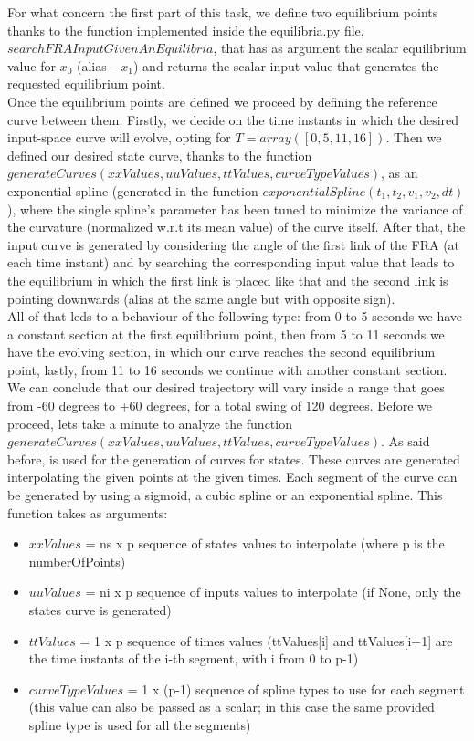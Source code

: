 \documentclass[a4paper,11pt,oneside]{book}
\begin{document}
\begin{justify}
    {For what concern the first part of this task, we define two equilibrium points thanks to the function implemented inside the equilibria.py file, $searchFRAInputGivenAnEquilibria$, that has as argument the scalar equilibrium value for $x_{0}$ (alias $-x_{1}$) and returns the scalar input value that generates the requested equilibrium point.
    \\Once the equilibrium points are defined we proceed by defining the reference curve between them. Firstly, we decide on the time instants in which the desired input-space curve will evolve, opting for $T = array([0, 5, 11, 16])$. Then we defined our desired state curve, thanks to the function $generateCurves(xxValues, uuValues, ttValues, curveTypeValues)$, as an exponential spline (generated in the function $exponentialSpline(t_1, t_2, v_1, v_2, dt)$), where the single spline's parameter has been tuned to minimize the variance of the curvature (normalized w.r.t its mean value) of the curve itself. After that, the input curve is generated by considering the angle of the first link of the FRA (at each time instant) and by searching the corresponding input value that leads to the equilibrium in which the first link is placed like that and the second link is pointing downwards (alias at the same angle but with opposite sign). \\All of that leds to a behaviour of the following type: from 0 to 5 seconds we have a constant section at the first equilibrium point, then from 5 to 11 seconds we have the evolving section, in which our curve reaches the second equilibrium point, lastly, from 11 to 16 seconds we continue with another constant section. We can conclude that our desired trajectory will vary inside a range that goes from -60 degrees to +60 degrees, for a total swing of 120 degrees. Before we proceed, let\textquotesingle s take a minute to analyze the function $generateCurves(xxValues, uuValues, ttValues, curveTypeValues)$. As said before, is used for the generation of curves for states. These curves are generated interpolating the given points at the given times. Each segment of the curve can be generated by using a sigmoid, a cubic spline or an exponential spline. This function takes as arguments:}
\end{justify}
\begin{itemize}
    \item $xxValues$ = ns x p sequence of states values to interpolate (where p is the numberOfPoints)
    \item $uuValues$ = ni x p sequence of inputs values to interpolate (if None, only the states curve is generated)
    \item $ttValues$ = 1 x p sequence of times values (ttValues[i] and ttValues[i+1] are the time instants of the i-th segment, with i from 0 to p-1)
    \item $curveTypeValues$ = 1 x (p-1) sequence of spline types to use for each segment
    (this value can also be passed as a scalar; in this case the same provided spline type is used for all the segments)
\end{itemize}
\end{document}
